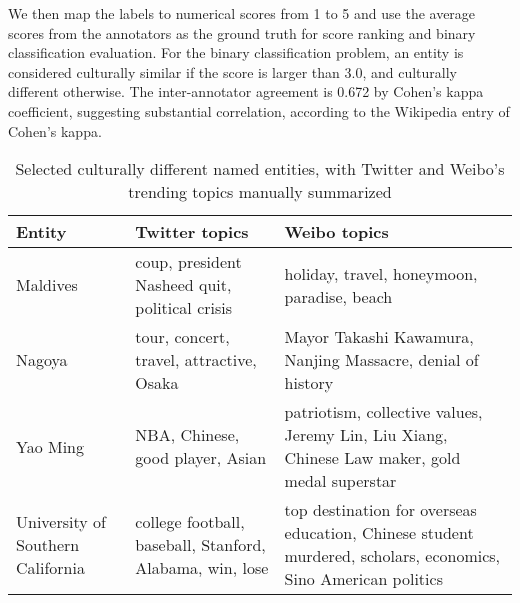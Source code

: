 We then map the labels to numerical scores from 1 to 5
and use the average scores from the annotators as the ground truth 
for score ranking and binary classification evaluation.
For the binary classification problem, 
an entity is considered culturally similar 
if the score is larger than 3.0, and culturally different otherwise.
The inter-annotator agreement is 0.672 by Cohen's kappa coefficient, 
suggesting substantial correlation, according to the Wikipedia entry
of Cohen's kappa.
\begin{table*}[th!]
	\footnotesize
	\centering
	\caption{{Selected culturally different named entities, with Twitter and Weibo's trending topics manually summarized}}
	\begin{tabular}{|L{1.5cm}|L{5cm}|L{8cm}|}
		\hline
		\textbf{Entity} & \textbf{Twitter topics} & \textbf{Weibo topics}
		\\ \hline\hline
		Maldives & coup, president Nasheed quit, political crisis & holiday, travel, honeymoon, paradise, beach \\ \hline
		Nagoya & tour, concert, travel, attractive, Osaka & Mayor Takashi Kawamura, Nanjing Massacre, denial of history\\  \hline
		Yao Ming & NBA, Chinese, good player, Asian  & patriotism, collective values, Jeremy Lin, Liu Xiang, Chinese Law maker, gold medal superstar   \\ \hline
		University of Southern California & college football, baseball, Stanford, Alabama, win, lose & top destination for overseas education, 
Chinese student murdered, scholars, economics, Sino American politics \\ \hline
	\end{tabular}
	\label{tab:mcdne_res_4}
\end{table*}
\vspace{-10pt}

